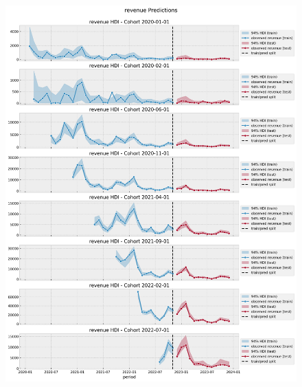 \documentclass[11pt]{amsart}
\begin{document}
\begin{figure}
    \includegraphics[width=\textwidth]{images/revenue_retention_68_0.png}
\end{figure}

\newpage

\end{document}

